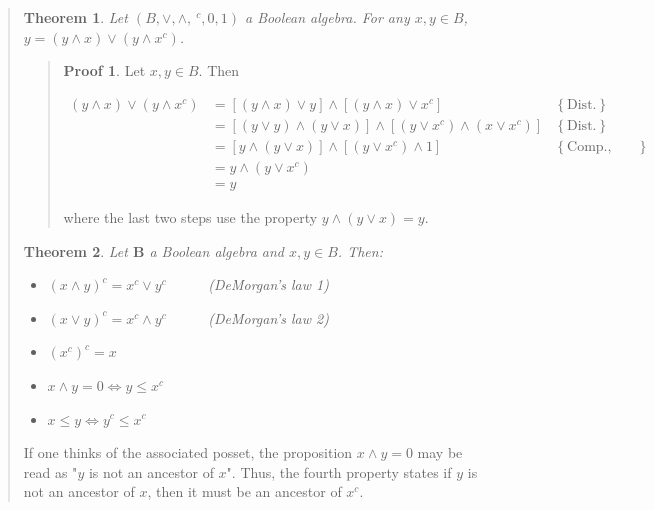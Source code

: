 \documentclass[a4paper, 12pt]{article}
\newtheorem{theorem}{Theorem}
\theoremstyle{definition}
\theoremstyle{definition}
\theoremstyle{definition}
\newtheorem{pro}{Proof}
\begin{document}
\begin{quote}
\begin{theorem}
    Let $(B, \lor , \land , ~^c, 0, 1)$ a Boolean algebra. For any $x, y \in B$,
    $y = (y \land  x) \lor  (y \land x^c)$.
\end{theorem}


\small
\begin{quote}

\begin{pro}
    Let $x, y \in B$. Then

    \begin{align*}
        (y \land  x) \lor  (y \land x^c) &= \left[ (y\land x) \lor  y \right] \land \left[ (y \land  x) \lor  x^c \right] &\left\{ \text{Dist.} \right\} \\ 
                                         &=\left[ (y \lor  y) \land  (y \lor  x) \right] \land \left[ (y \lor x^c) \land (x \lor  x^c) \right] &\left\{ \text{Dist.} \right\} \\ 
                                         &=\left[ y \land (y \lor  x) \right] \land \left[ (y \lor  x^c) \land 1 \right] &\left\{ \text{Comp., abs.} \right\} \\ 
            &= y \land (y \lor  x^c) \\ 
            &=y
    \end{align*}

    where the last two steps use the property $y \land (y\lor x) = y$.

\end{pro}

\end{quote}
\normalsize

\begin{theorem}
    Let $\textbf{B}$ a Boolean algebra and $x, y \in B$. Then: 

    \begin{itemize}
        \item $(x \land y)^c = x^c \lor  y^c$ ~ ~ ~ (DeMorgan's law 1)
        \item $(x \lor  y)^c = x^c \land   y^c$ ~ ~ ~ (DeMorgan's law 2)
        \item $(x^c)^c = x$
        \item $x \land  y = 0 \iff y \leq x^c$
        \item $x \leq y \iff y^c \leq x^c$
    \end{itemize}
\end{theorem}

If one thinks of the associated posset, the proposition $x \land  y = 0$  may
be read as "$y$ is not an ancestor of $x$". Thus, the fourth property states 
if $y$ is not an ancestor of $x$, then it must be an ancestor of $x^c$.


\end{quote}
\end{document}
